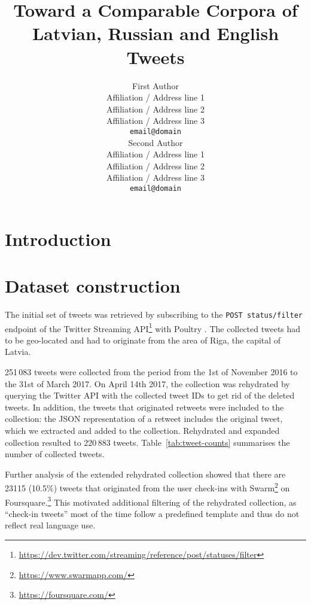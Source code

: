 \documentclass[11pt,a4paper]{article}
\title{Toward a Comparable Corpora of Latvian, Russian and English Tweets}
\author{First Author \\
  Affiliation / Address line 1 \\
  Affiliation / Address line 2 \\
  Affiliation / Address line 3 \\
  {\tt email@domain} \\\And
  Second Author \\
  Affiliation / Address line 1 \\
  Affiliation / Address line 2 \\
  Affiliation / Address line 3 \\
  {\tt email@domain} \\}
\date{}
\begin{document}
\maketitle
\begin{abstract}
\end{abstract}

\section{Introduction}
\label{sec:introduction}

\section{Dataset construction}
\label{sec:construction}

The initial set of tweets was retrieved by subscribing to the \texttt{POST status/filter} endpoint of the Twitter Streaming API\footnote{\url{https://dev.twitter.com/streaming/reference/post/statuses/filter}} with Poultry \cite{dmitrijs_milajevs_2017_546609}. The collected tweets had to be geo-located and had to originate from the area of Riga, the capital of Latvia.\footnotemark{}


251\,083 tweets were collected from the period from the 1st of November 2016 to the 31st of March 2017. On April 14th 2017, the collection was rehydrated by querying the Twitter API with the collected tweet IDs to get rid of the deleted tweets. In addition, the tweets that originated retweets were included to the collection: the JSON representation of a retweet includes the original tweet, which we extracted and added to the collection. Rehydrated and expanded collection resulted to 220\,883 tweets. Table~\ref{tab:tweet-counts} summarises the number of collected tweets. 



Further analysis of the extended rehydrated collection showed that there are 23115 (10.5\%) tweets that originated from the user check-ins with Swarm\footnote{\url{https://www.swarmapp.com/}} on Foursquare.\footnote{\url{https://foursquare.com/}} This motivated additional filtering of the rehydrated collection, as ``check-in tweets'' most of the time follow a predefined template and thus do not reflect real language use. 


\end{document}
